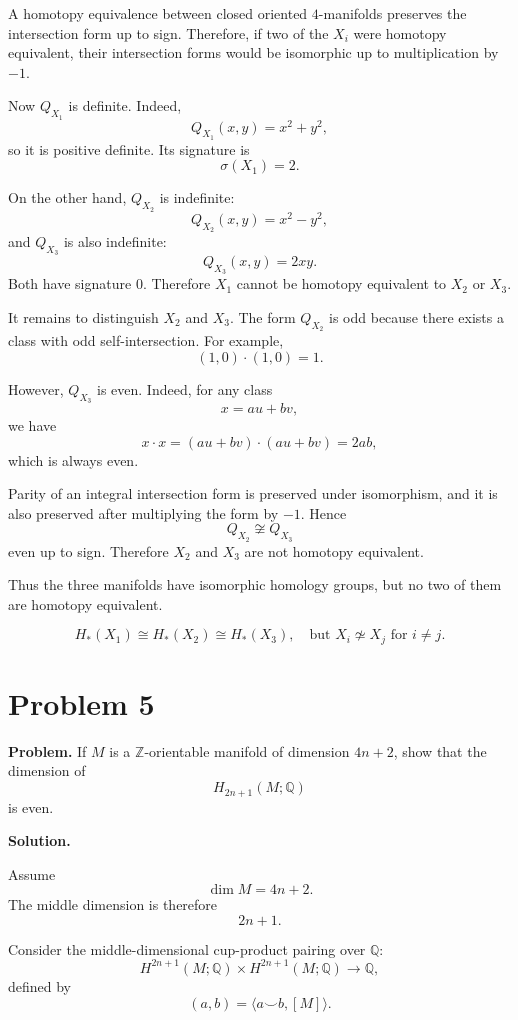 \documentclass[12pt,a4paper]{article}
\theoremstyle{notespace}
\begin{document}
A homotopy equivalence between closed oriented \(4\)-manifolds preserves the
intersection form up to sign. Therefore, if two of the \(X_i\) were homotopy
equivalent, their intersection forms would be isomorphic up to multiplication by
\(-1\).

Now \(Q_{X_1}\) is definite. Indeed,
\[
Q_{X_1}(x,y)=x^2+y^2,
\]
so it is positive definite. Its signature is
\[
\sigma(X_1)=2.
\]

On the other hand, \(Q_{X_2}\) is indefinite:
\[
Q_{X_2}(x,y)=x^2-y^2,
\]
and \(Q_{X_3}\) is also indefinite:
\[
Q_{X_3}(x,y)=2xy.
\]
Both have signature \(0\). Therefore \(X_1\) cannot be homotopy equivalent to
\(X_2\) or \(X_3\).

It remains to distinguish \(X_2\) and \(X_3\). The form \(Q_{X_2}\) is odd because
there exists a class with odd self-intersection. For example,
\[
(1,0)\cdot (1,0)=1.
\]

However, \(Q_{X_3}\) is even. Indeed, for any class
\[
x=au+bv,
\]
we have
\[
x\cdot x=(au+bv)\cdot(au+bv)
=2ab,
\]
which is always even.

Parity of an integral intersection form is preserved under isomorphism, and it is
also preserved after multiplying the form by \(-1\). Hence
\[
Q_{X_2}\not\cong Q_{X_3}
\]
even up to sign. Therefore \(X_2\) and \(X_3\) are not homotopy equivalent.

Thus the three manifolds have isomorphic homology groups, but no two of them are
homotopy equivalent.

\[
\boxed{
	H_*(X_1)\cong H_*(X_2)\cong H_*(X_3),
	\quad
	\text{but } X_i\not\simeq X_j \text{ for } i\neq j.
}
\]

\section{Problem 5}

\textbf{Problem.}
If \(M\) is a \(\mathbb Z\)-orientable manifold of dimension \(4n+2\), show that
the dimension of
\[
H_{2n+1}(M;\mathbb Q)
\]
is even.

\medskip

\noindent\textbf{Solution.}

Assume
\[
\dim M=4n+2.
\]
The middle dimension is therefore
\[
2n+1.
\]

Consider the middle-dimensional cup-product pairing over \(\mathbb Q\):
\[
H^{2n+1}(M;\mathbb Q)\times H^{2n+1}(M;\mathbb Q)
\longrightarrow \mathbb Q,
\]
defined by
\[
(a,b)=\langle a\smile b,[M]\rangle.
\]
\end{document}
